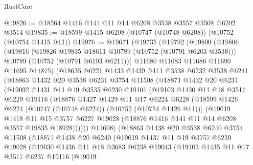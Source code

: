 \begin{lexlean}{RustCore}
\begin{coremodule}
@19826 := @18564 @1416 @141 @11 @14 @6208 @3538 @3557 @3508 @6202 @3514
@19835 := @18599 @1415 @6208 (@10747 (@10748 @6208)) (@10752 (@10754 @1415 @11))
@19976 := @19671
    (@19735
      (@19792
        (@19800
          (@19806
            (@19816
              (@19826 @19835 @18611 @10789 (@10752 (@10791 @6203 @3538)))
              @10789
              (@10752 (@10791 @6193 @6211)))
            @11680
            @11683
            @11686
            @11690
            @11695
            @14875)
          (@18635
            @6221
            @1433
            @1439
            @111
            @3538
            @6232
            @3538
            @6241
            (@18863
              @1432
              @20
              @3538
              @6231
              @3754
              @11508
              (@18871
                @1432
                @20
                @6231
                (@19092
                  @1431
                  @11
                  @19
                  @3535
                  @6230
                  @19101
                  (@19103
                    @1430
                    @11
                    @18
                    @3517
                    @6229
                    @19116
                    (@18876
                      @1427
                      @1429
                      @11
                      @17
                      @6224
                      @6228
                      (@18599 @1426 @6224 (@10747 (@10748 @6224)) (@10752 (@10754 @1426 @11)))
                      (@19019
                        @1418
                        @11
                        @15
                        @3757
                        @6227
                        @19028
                        (@18876 @1416 @141 @11 @14 @6208 @3557 @19835 @18928))))))
              @11608)
            (@18863
              @1438
              @20
              @3538
              @6240
              @3754
              @11508
              (@18871
                @1438
                @20
                @6240
                (@19019
                  @1437
                  @11
                  @19
                  @3757
                  @6239
                  @19028
                  (@19030
                    @1436
                    @11
                    @18
                    @3683
                    @6238
                    @19043
                    (@19103
                      @1435
                      @11
                      @17
                      @3517
                      @6237
                      @19116
                      (@19019

\end{coremodule}
\end{lexlean}
